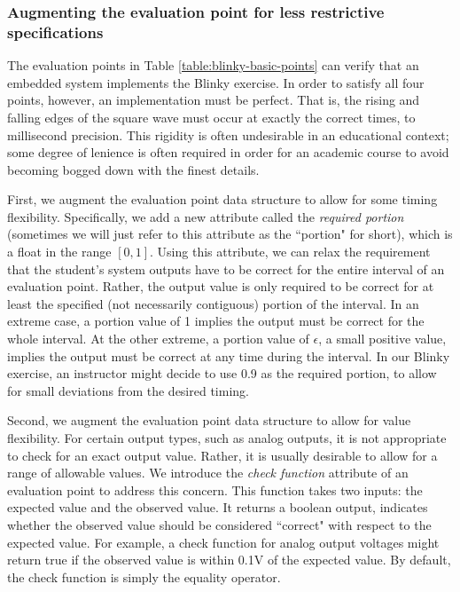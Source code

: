 \documentclass[12pt]{article}
\begin{document}
\subsubsection{Augmenting the evaluation point for less restrictive specifications}
The evaluation points in Table \ref{table:blinky-basic-points} can verify that an embedded system implements the Blinky exercise.  In order to satisfy all four points, however, an implementation must be perfect.  That is, the rising and falling edges of the square wave must occur at exactly the correct times, to millisecond precision.  This rigidity is often undesirable in an educational context; some degree of lenience is often required in order for an academic course to avoid becoming bogged down with the finest details.

First, we augment the evaluation point data structure to allow for some timing flexibility.  Specifically, we add a new attribute called the \textit{required portion} (sometimes we will just refer to this attribute as the ``portion" for short), which is a float in the range $[0,1]$.  Using this attribute, we can relax the requirement that the student's system outputs have to be correct for the entire interval of an evaluation point.  Rather, the output value is only required to be correct for at least the specified (not necessarily contiguous) portion of the interval.  In an extreme case, a portion value of 1 implies the output must be correct for the whole interval.  At the other extreme, a portion value of $\epsilon$, a small positive value, implies the output must be correct at any time during the interval.  In our Blinky exercise, an instructor might decide to use 0.9 as the required portion, to allow for small deviations from the desired timing.

Second, we augment the evaluation point data structure to allow for value flexibility.  For certain output types, such as analog outputs, it is not appropriate to check for an exact output value.  Rather, it is usually desirable to allow for a range of allowable values.  We introduce the \textit{check function} attribute of an evaluation point to address this concern.  This function takes two inputs: the expected value and the observed value.  It returns a boolean output, indicates whether the observed value should be considered ``correct" with respect to the expected value.  For example, a check function for analog output voltages might return true if the observed value is within 0.1V of the expected value.  By default, the check function is simply the equality operator.
\end{document}
